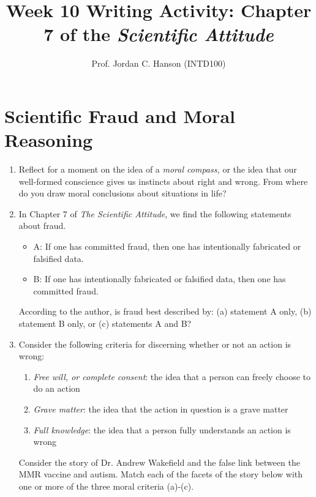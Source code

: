 \documentclass{article}
\begin{document}
\title{Week 10 Writing Activity: Chapter 7 of the \textit{Scientific Attitude}}
\author{Prof. Jordan C. Hanson (INTD100)}

\maketitle

\section{Scientific Fraud and Moral Reasoning}

\begin{enumerate}
\item Reflect for a moment on the idea of a \textit{moral compass,} or the idea that our well-formed conscience gives us instincts about right and wrong.  From where do you draw moral conclusions about situations in life? \\ \vspace{2cm}
\item In Chapter 7 of \textit{The Scientific Attitude}, we find the following statements about fraud.
\begin{itemize}
\item A: If one has committed fraud, then one has intentionally fabricated or falsified data.
\item B: If one has intentionally fabricated or falsified data, then one has committed fraud.
\end{itemize}
According to the author, is fraud best described by: (a) statement A only, (b) statement B only, or (c) statements A and B? \\ \vspace{0.5cm}
\item Consider the following criteria for discerning whether or not an action is wrong:
\begin{enumerate}
\item \textit{Free will, or complete consent}: the idea that a person can freely choose to do an action
\item \textit{Grave matter}: the idea that the action in question is a grave matter
\item \textit{Full knowledge}: the idea that a person fully understands an action is wrong
\end{enumerate}
Consider the story of Dr. Andrew Wakefield and the false link between the MMR vaccine and autism.  Match each of the facets of the story below with one or more of the three moral criteria (a)-(c).

\end{enumerate}
\end{document}
